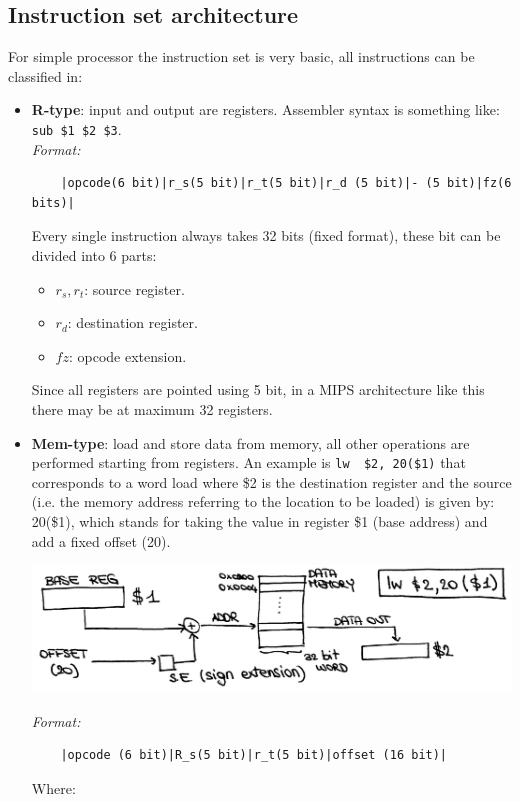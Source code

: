 \subsection{Instruction set architecture}
For simple processor the instruction set is very basic, all instructions can be
classified in:
\begin{itemize}
  \item \textbf{R-type}: input and output are registers. Assembler syntax is
    something like: \verb|sub $1 $2 $3|.\\
    \textit{Format:}
    \begin{verbatim}
    |opcode(6 bit)|r_s(5 bit)|r_t(5 bit)|r_d (5 bit)|- (5 bit)|fz(6 bits)|
    \end{verbatim}
    Every single instruction always takes 32 bits (fixed format), these bit can
    be divided into 6 parts:
    \begin{itemize}
    \item $r_s, r_t$: source register.
    \item $r_d$: destination register.
    \item $fz$: opcode extension.
    \end{itemize}
    Since all registers are pointed using 5 bit, in a MIPS architecture like
    this there may be at maximum 32 registers.
  \item \textbf{Mem-type}: load and store data from memory, all other operations
    are performed starting from registers.
    An example is \verb|lw  $2, 20($1)| that corresponds to a word load where
    \$2 is the destination register and the source (i.e. the memory address
    referring to the location to be loaded) is given by: 20(\$1), which stands
    for taking the value in register \$1 (base address) and add a fixed
    offset (20).
    \begin{center}
      \includegraphics[width=0.8\linewidth]{img/img3/1}
    \end{center}
    \textit{Format:}
    \begin{verbatim}
    |opcode (6 bit)|R_s(5 bit)|r_t(5 bit)|offset (16 bit)|
    \end{verbatim}
    Where:
    \begin{itemize}

\end{itemize}
\end{itemize}
